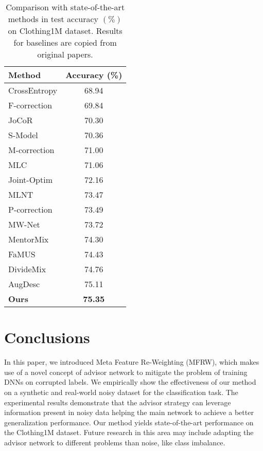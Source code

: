 \documentclass[runningheads]{llncs}
\begin{document}
	
	\begin{table}[!t]
		\centering
		\caption{\label{clothing} Comparison with state-of-the-art methods in test accuracy $(\%)$ on Clothing1M dataset. Results for baselines are copied from original papers.}
		\begin{tabular}{l|c}
			\hline
			Method       & Accuracy (\%) \\ \hline
			CrossEntropy \cite{shu2019meta}          & 68.94         \\
			F-correction \cite{patrini2017making} & 69.84         \\
			JoCoR \cite{wei2020combating}       & 70.30         \\
			S-Model \cite{goldberger2016training} & 70.36         \\
			M-correction \cite{arazo2019unsupervised} & 71.00         \\
			MLC \cite{wang2020training}         & 71.06         \\
			Joint-Optim \cite{tanaka2018joint}  & 72.16         \\
			MLNT \cite{li2019learning}        & 73.47         \\
			P-correction \cite{yi2019probabilistic} & 73.49         \\
			MW-Net \cite{shu2019meta}      & 73.72         \\
			MentorMix \cite{jiang2020beyond}   & 74.30         \\
			FaMUS \cite{xu2021faster} & 74.43 \\
			DivideMix \cite{li2019dividemix} & 74.76 \\
			AugDesc \cite{nishi2021augmentation} & 75.11 \\ \hline
			\textbf{Ours}         & \textbf{75.35}         \\ \hline
		\end{tabular}
	\end{table}
	
	\section{Conclusions}
	
	In this paper, we introduced Meta Feature Re-Weighting (MFRW), which makes use of a novel concept of advisor network to mitigate the problem of training DNNs on corrupted labels. We empirically show the effectiveness of our method on a synthetic and real-world noisy dataset for the classification task. The experimental results demonstrate that the advisor strategy can leverage information present in noisy data helping the main network to achieve a better generalization performance. Our method yields state-of-the-art performance on the Clothing1M dataset. Future research in this area may include adapting the advisor network to different problems than noise, like class imbalance.
	

	
\end{document}
